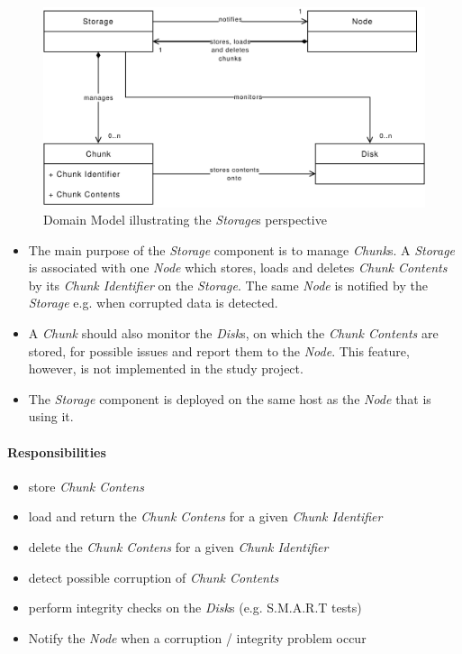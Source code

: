 \begin{figure}[h]
    \centering
    \includegraphics[width=1\linewidth]{resources/storage_domain_model}
    \caption[Storage Domain Model]{Domain Model illustrating the \emph{Storage}s perspective}
\end{figure}

\begin{itemize}
    \item The main purpose of the \emph{Storage} component is to manage \emph{Chunk}s. A \emph{Storage} is associated with one \emph{Node} which stores, loads and deletes \emph{Chunk Contents} by its \emph{Chunk Identifier} on the \emph{Storage}. The same \emph{Node} is notified by the \emph{Storage} e.g. when corrupted data is detected.
    \item A \emph{Chunk} should also monitor the \emph{Disk}s, on which the \emph{Chunk Contents} are stored, for possible issues and report them to the \emph{Node}. This feature, however, is not implemented in the study project.
    \item The \emph{Storage} component is deployed on the same host as the \emph{Node} that is using it.
\end{itemize}


\paragraph{Responsibilities}

\begin{itemize}
    \item store \emph{Chunk Contens}
    \item load and return the \emph{Chunk Contens} for a given \emph{Chunk Identifier}
    \item delete the \emph{Chunk Contens} for a given \emph{Chunk Identifier}
    \item detect possible corruption of \emph{Chunk Contents}
    \item perform integrity checks on the \emph{Disk}s (e.g. S.M.A.R.T tests)
    \item Notify the \emph{Node} when a corruption / integrity problem occur
\end{itemize}

